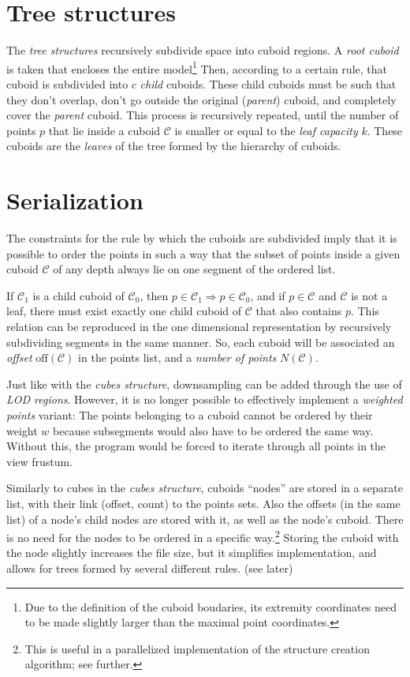\documentclass[a4paper,10pt,abstracton,notitlepage]{scrreprt}
\begin{document}
\section{Tree structures}
The \emph{tree structures} recursively subdivide space into cuboid regions. A \emph{root cuboid} is taken that encloses the entire model\footnote{Due to the definition of the cuboid boudaries, its extremity coordinates need to be made slightly larger than the maximal point coordinates.} Then, according to a certain rule, that cuboid is subdivided into $c$ \emph{child} cuboids. These child cuboids must be such that they don't overlap, don't go outside the original (\emph{parent}) cuboid, and completely cover the \emph{parent} cuboid. This process is recursively repeated, until the number of points $p$ that lie inside a cuboid $\mathcal{C}$ is smaller or equal to the \emph{leaf capacity} $k$. These cuboids are the \emph{leaves} of the tree formed by the hierarchy of cuboids.


\section{Serialization} \label{sec:tree_ser}
The constraints for the rule by which the cuboids are subdivided imply that it is possible to order the points in such a way that the subset of points inside a given cuboid $\mathcal{C}$ of any depth always lie on one segment of the ordered list.

If $\mathcal{C}_{1}$ is a child cuboid of $\mathcal{C}_{0}$, then $p \in \mathcal{C}_{1} \Rightarrow p \in \mathcal{C}_{0}$, and if $p \in \mathcal{C}$ and $\mathcal{C}$ is not a leaf, there must exist exactly one child cuboid of $\mathcal{C}$ that also contains $p$. This relation can be reproduced in the one dimensional representation by recursively subdividing segments in the same manner. So, each cuboid will be associated an \emph{offset} $\text{off}(\mathcal{C})$ in the points list, and a \emph{number of points} $N(\mathcal{C})$.

Just like with the \emph{cubes structure}, downsampling can be added through the use of \emph{LOD regions}. However, it is no longer possible to effectively implement a \emph{weighted points} variant: The points belonging to a cuboid cannot be ordered by their weight $w$ because subsegments would also have to be ordered the same way. Without this, the program would be forced to iterate through all points in the view frustum.

Similarly to cubes in the \emph{cubes structure}, cuboids ``nodes'' are stored in a separate list, with their link (offset, count) to the points sets. Also the offsets (in the same list) of a node's child nodes are stored with it, as well as the node's cuboid. There is no need for the nodes to be ordered in a specific way.\footnote{This is useful in a parallelized implementation of the structure creation algorithm; see further.} Storing the cuboid with the node slightly increases the file size, but it simplifies implementation, and allows for trees formed by several different rules. (see later)
\end{document}
